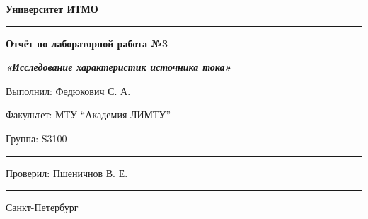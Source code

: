 \documentclass[12pt]{article}
\begin{document}
\pagestyle{empty}
\begin{center}
\large{\textbf{Университет ИТМО}}
\end{center}
\rule{550pt}{1pt}
\par\bigskip\par\bigskip\par\bigskip\par\bigskip\par\bigskip\par\bigskip\par\bigskip\par\bigskip
\begin{center}
\Large
\textbf{Отчёт по лабораторной работа №3}

\textbf{\textit{«Исследование характеристик источника тока»}}


\end{center}
\par\bigskip\par\bigskip\par\bigskip\par\bigskip\par\bigskip\par\bigskip\par\bigskip\par\bigskip\par\bigskip\par\bigskip\par\bigskip\par\bigskip\par\bigskip\par\bigskip      
\begin{flushright}
\large
Выполнил: Федюкович С. А.
\par\bigskip
Факультет: МТУ “Академия ЛИМТУ”
\par\bigskip
Группа: S3100                       
\par\bigskip\par\bigskip\par\bigskip

\rule{150pt}{0.5pt}
\par\bigskip\par\bigskip\par\bigskip\par\bigskip                                                            
 Проверил: Пшеничнов В. Е.
\par\bigskip \par\bigskip

\rule{150pt}{0.5pt}
\end{flushright}
\par\bigskip\par\bigskip\par\bigskip\par\bigskip\par\bigskip\par\bigskip\par\bigskip\par\bigskip\par\bigskip\par\bigskip     
\begin{center}
\large
Санкт-Петербург
\par{}
\end{center}
\newpage
\end{document}
